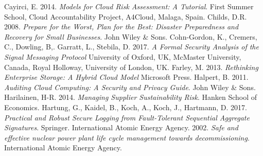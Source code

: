 \documentclass{article}
\begin{document}
\begin{thebibliography}{9}
        Cayirci, E.
	2014.
        \textit{Models for Cloud Risk Assessment: A Tutorial}.
        First Summer School, Cloud Accountability Project, A4Cloud, Malaga, Spain.
        Childs, D.R.
        2008.
        \textit{Prepare for the Worst, Plan for the Best: Disaster Preparedness and Recovery for Small Businesses}.
	John Wiley \& Sons.
        Cohn-Gordon, K.,
        Cremers, C.,
        Dowling, B,.
        Garratt, L.,
        Stebila, D.
        2017.
        \textit{A Formal Security Analysis of the Signal Messaging Protocol}
	University of Oxford, UK,
        McMaster University, Canada,
        Royal Holloway, University of London, UK.
        Farley, M.
        2013.
	\textit{Rethinking Enterprise Storage: A Hybrid Cloud Model}
        Microsoft Press.
        Halpert, B.
        2011.
	\textit{Auditing Cloud Computing: A Security and Privacy Guide}.
	John Wiley \& Sons.
	Harilainen, H-R.
	2014.
	\textit{Managing Supplier Sustainability Risk}.
	Hanken School of Economics.
        Hartung, G.,
        Kaidel, B.,
        Koch, A.,
        Koch, J.,
        Hartmann, D.
        2017.
	\textit{Practical and Robust Secure Logging from Fault-Tolerant Sequential Aggregate Signatures}.
        Springer.
	International Atomic Energy Agency.
	2002.
	\textit{Safe and effective nuclear power plant life cycle management towards decommissioning}.
	International Atomic Energy Agency.


\end{thebibliography}
\end{document}
